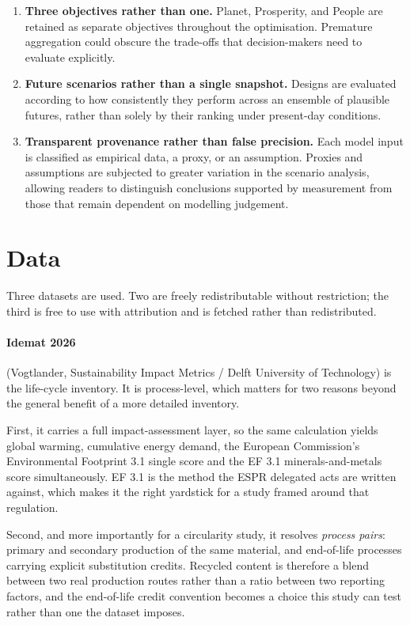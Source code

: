 \documentclass[11pt,a4paper]{article}
\begin{document}
\begin{enumerate}
\item \textbf{Three objectives rather than one.} Planet, Prosperity, and
People are retained as separate objectives throughout the optimisation.
Premature aggregation could obscure the trade-offs that decision-makers
need to evaluate explicitly.
\item \textbf{Future scenarios rather than a single snapshot.} Designs are
evaluated according to how consistently they perform across an ensemble of
plausible futures, rather than solely by their ranking under present-day
conditions.
\item \textbf{Transparent provenance rather than false precision.} Each
model input is classified as empirical data, a proxy, or an assumption.
Proxies and assumptions are subjected to greater variation in the scenario
analysis, allowing readers to distinguish conclusions supported by
measurement from those that remain dependent on modelling judgement.
\end{enumerate}

\section{Data}

Three datasets are used. Two are freely redistributable without restriction;
the third is free to use with attribution and is fetched rather than
redistributed.

\paragraph{Idemat 2026} (Vogtlander, Sustainability Impact Metrics / Delft
University of Technology) is the life-cycle inventory. It is process-level,
which matters for two reasons beyond the general benefit of a more detailed
inventory.

First, it carries a full impact-assessment layer, so the same calculation
yields global warming, cumulative energy demand, the European Commission's
Environmental Footprint 3.1 single score and the EF 3.1 minerals-and-metals
score simultaneously. EF 3.1 is the method the ESPR delegated acts are written
against, which makes it the right yardstick for a study framed around that
regulation.

Second, and more importantly for a circularity study, it resolves \emph{process
pairs}: primary and secondary production of the same material, and end-of-life
processes carrying explicit substitution credits. Recycled content is therefore
a blend between two real production routes rather than a ratio between two
reporting factors, and the end-of-life credit convention becomes a choice this
study can test rather than one the dataset imposes.
\end{document}
